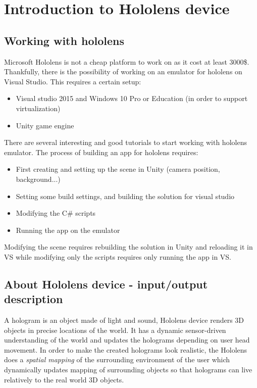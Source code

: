 \section{Introduction to Hololens device}

\subsection{Working with hololens}

Microsoft Hololens is not a cheap platform to work on as it cost at least 3000\$. Thankfully, there is the possibility of working on an emulator for hololens on Visual Studio. This requires a certain setup:
\begin{itemize}
	\item Visual studio 2015 and Windows 10 Pro or Education (in order to support virtualization)
	\item Unity game engine
\end{itemize}

There are several interesting and good tutorials to start working with hololens emulator. The process of building an app for hololens requires:
\begin{itemize}
	\item First creating and setting up the scene in Unity (camera position, background...)
	\item Setting some build settings, and building the solution for visual studio
	\item Modifying the C\# scripts 
	\item Running the app on the emulator
\end{itemize}

Modifying the scene requires rebuilding the solution in Unity and reloading it in VS while modifying only the scripts requires only running the app in VS.

\subsection{About Hololens device - input/output description}

A hologram is an object made of light and sound, Hololens device renders 3D objects in precise locations of the world. It has a dynamic sensor-driven understanding of the world and updates the holograms depending on user head movement. In order to make the created holograms look realistic, the Hololens does a \emph{spatial mapping} of the surrounding environment of the user which dynamically updates mapping of surrounding objects so that holograms can live relatively to the real world 3D objects. 

